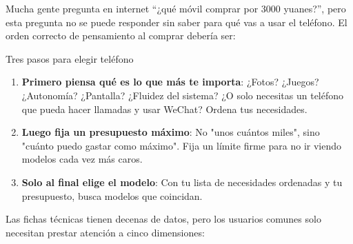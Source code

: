 


Mucha gente pregunta en internet “¿qué móvil comprar por 3000 yuanes?”, pero esta pregunta no se puede responder sin saber para qué vas a usar el teléfono. El orden correcto de pensamiento al comprar debería ser:

\begin{tcbinfo}{Tres pasos para elegir teléfono}
\begin{enumerate}
  \item \textbf{Primero piensa qué es lo que más te importa}: ¿Fotos? ¿Juegos? ¿Autonomía? ¿Pantalla? ¿Fluidez del sistema? ¿O solo necesitas un teléfono que pueda hacer llamadas y usar WeChat? Ordena tus necesidades.
  \item \textbf{Luego fija un presupuesto máximo}: No "unos cuántos miles", sino "cuánto puedo gastar como máximo". Fija un límite firme para no ir viendo modelos cada vez más caros.
  \item \textbf{Solo al final elige el modelo}: Con tu lista de necesidades ordenadas y tu presupuesto, busca modelos que coincidan.
\end{enumerate}

\end{tcbinfo}


Las fichas técnicas tienen decenas de datos, pero los usuarios comunes solo necesitan prestar atención a cinco dimensiones:

